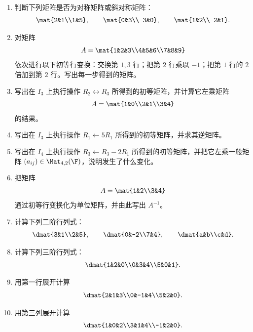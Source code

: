 \begin{enumerate}[label=\arabic*.]
  \item \basic 判断下列矩阵是否为对称矩阵或斜对称矩阵：
  \[
  \mat{2&1\\1&5},\qquad \mat{0&3\\-3&0},\qquad \mat{1&2\\-2&1}.
  \]

  \item \basic 对矩阵
  \[
  A=\mat{1&2&3\\4&5&6\\7&8&9}
  \]
  依次进行以下初等行变换：交换第 $1,3$ 行；把第 $2$ 行乘以 $-1$；把第 $1$ 行的 $2$ 倍加到第 $2$ 行。写出每一步得到的矩阵。

  \item \basic 写出在 $I_3$ 上执行操作 $R_2\leftrightarrow R_3$ 所得到的初等矩阵，并计算它左乘矩阵
  \[
  A=\mat{1&0\\2&1\\3&4}
  \]
  的结果。

  \item \basic 写出在 $I_3$ 上执行操作 $R_1\leftarrow 5R_1$ 所得到的初等矩阵，并求其逆矩阵。

  \item \basic 写出在 $I_4$ 上执行操作 $R_3\leftarrow R_3-2R_1$ 所得到的初等矩阵，并把它左乘一般矩阵 $(a_{ij})\in\Mat_{4,2}(\F)$，说明发生了什么变化。

  \item \basic 把矩阵
  \[
  A=\mat{1&2\\3&4}
  \]
  通过初等行变换化为单位矩阵，并由此写出 $A^{-1}$。

  \item \basic 计算下列二阶行列式：
  \[
  \dmat{3&1\\2&5},\qquad \dmat{0&-2\\7&4},\qquad \dmat{a&b\\c&d}.
  \]

  \item \basic 计算下列三阶行列式：
  \[
  \dmat{1&2&0\\0&3&4\\5&0&1}.
  \]

  \item \basic 用第一行展开计算
  \[
  \dmat{2&1&3\\0&-1&4\\5&2&0}.
  \]

  \item \basic 用第三列展开计算
  \[
  \dmat{1&0&2\\3&1&4\\-1&2&0}.
  \]


\end{enumerate}
